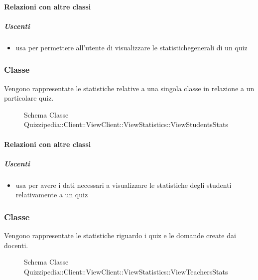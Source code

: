 \paragraph{Relazioni con altre classi}
\subparagraph{Uscenti}
\begin{itemize}
\item usa  per permettere all'utente di visualizzare le statistichegenerali di un quiz
\end{itemize}
\subsubsection{Classe }
Vengono rappresentate le statistiche relative a una singola classe in relazione a un particolare quiz.
\begin{figure}[H]
\centering
\noindent{}
\caption[Schema Classe ViewStudentsStats]{Schema Classe Quizzipedia::Client::ViewClient::ViewStatistics::ViewStudentsStats}
\end{figure}
\paragraph{Relazioni con altre classi}
\subparagraph{Uscenti}
\begin{itemize}
\item usa  per avere i dati necessari a visualizzare le statistiche degli studenti relativamente a un quiz
\end{itemize}
\subsubsection{Classe }
Vengono rappresentate le statistiche riguardo i quiz e le domande create dai docenti.
\begin{figure}[H]
\centering
\noindent{}
\caption[Schema Classe ViewTeachersStats]{Schema Classe Quizzipedia::Client::ViewClient::ViewStatistics::ViewTeachersStats}
\end{figure}
